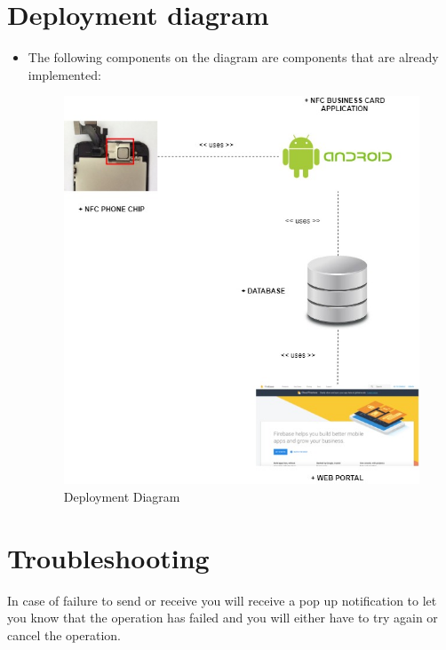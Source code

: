 \documentclass[english]{article}
\begin{document}
	\section {Deployment diagram}
		\begin{itemize}
			\item The following components on the diagram are components that are already implemented:
			\begin{figure}[H]
				\centering
				\includegraphics[scale=0.3]{Deployment.jpg}
				\caption{Deployment Diagram}
				\label{figure: 10}
			\end{figure}
		\end{itemize}
	\section {Troubleshooting}
		In case of failure to send or receive you will receive a pop up notification to let you know that the operation has failed and you will either have to try again or cancel the operation.
	
\end{document}
